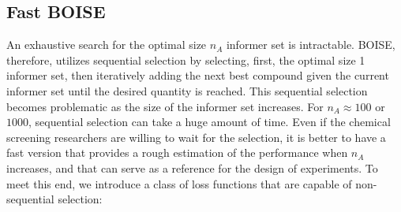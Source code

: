 \documentclass[11pt,a4paper]{article}
\theoremstyle{plain}
\begin{document}
\subsection{Fast BOISE}
An exhaustive search for the optimal size $n_A$ informer set is intractable.
BOISE, therefore, utilizes sequential selection by selecting, first, the optimal size 1 informer set, then iteratively adding the next best compound given the current informer set until the desired quantity is reached.
This sequential selection becomes problematic as the size of the informer set increases.
For $n_A \approx 100$ or $1000$, sequential selection can take a huge amount of time. 
Even if the chemical screening researchers are willing to wait for the selection, it is better to have a fast version that provides a rough estimation of the performance when $n_A$ increases, and that can serve as a reference for the design of experiments. 
To meet this end, we introduce a class of loss functions that are capable of non-sequential selection:
\end{document}

